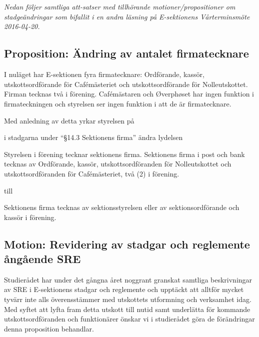 \documentclass[10pt]{article}
\begin{document}
    \section{\doctitle}

    \emph{Nedan följer samtliga att-satser med tillhörande motioner/propositioner om stadgeändringar som bifallit i en andra läsning på E-sektionens Vårterminsmöte 2016-04-20.}

    \subsection{Proposition: Ändring av antalet firmatecknare}
    I nuläget har E-sektionen fyra firmatecknare: Ordförande, kassör, utskottsordförande för Cafémästeriet och utskottsordförande för Nolleutskottet. Firman tecknas två i förening. Cafémästaren och Øverphøset har ingen funktion i firmateckningen och styrelsen ser ingen funktion i att de är firmatecknare.

    Med anledning av detta yrkar styrelsen på

    \begin{attsatser}
        \att i stadgarna under ``\S14.3 Sektionens firma'' ändra lydelsen\par
        \begin{itshape}
          Styrelsen i förening tecknar sektionens firma. Sektionens firma i post och bank tecknas av Ordförande, kassör, utskottsordföranden för Nolleutskottet och utskottsordföranden för Cafémästeriet, två (2) i förening.
        \end{itshape}\par
        till\par
        \begin{itshape}
          Sektionens firma tecknas av sektionsstyrelsen eller av sektionsordförande och kassör i förening.
        \end{itshape}
    \end{attsatser}

    \subsection{Motion: Revidering av stadgar och reglemente ångående SRE}
    Studierådet har under det gångna året noggrant granskat samtliga beskrivningar av SRE i E-sektionens stadgar och reglemente och upptäckt att alltför mycket tyvärr inte alls överensstämmer med utskottets utformning och verksamhet idag. Med syftet att lyfta fram detta utskott till nutid samt underlätta för kommande utskottsordföranden och funktionärer önskar vi i studierådet göra de förändringar denna proposition behandlar.
\end{document}
